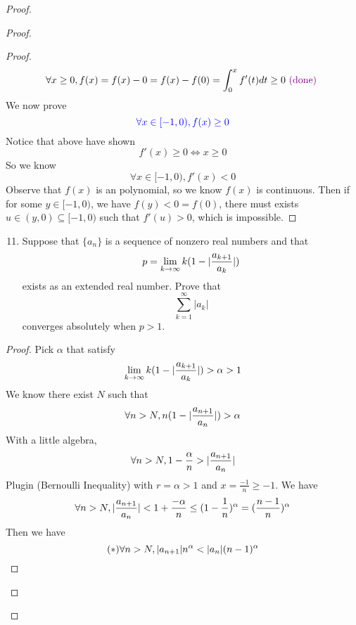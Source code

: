 \documentclass{report}
\begin{document}
\begin{proof}
\begin{proof}
\begin{proof}
\begin{equation}
\forall x\geq 0, f(x)=f(x)-0=f(x)-f(0)=\int_{0}^x f'(t)dt\geq 0\textcolor{violet}{\text{ (done) }}
\end{equation}
We now prove
\begin{equation}
\textcolor{blue}{\forall x\in [-1,0), f(x)\geq 0}
\end{equation}
Notice that above have shown
\begin{equation}
f'(x)\geq 0\iff  x\geq 0
\end{equation}
So we know
\begin{equation}
\forall x\in [-1,0), f'(x)<0
\end{equation}
Observe that $f(x)$ is an polynomial, so we know  $f(x)$ is continuous. Then if for some $y\in [-1,0)$, we have $f(y)<0=f(0)$, there must exists $u\in (y,0)\subseteq [-1,0)$ such that $f'(u)>0$, which is impossible.
\end{proof}
\begin{question}{}{}
\begin{enumerate}
    \setcounter{enumi}{10}
    \item Suppose that \( \{ a_n \} \) is a sequence of nonzero real numbers and that
    \[
    p = \lim_{{k \to \infty}} k(1-|\frac{a_{k+1}}{a_k}|)
    \]
    exists as an extended real number. Prove that
    \[
    \sum_{k=1}^{\infty} |a_k|
    \]
    converges absolutely when \( p > 1 \).
\end{enumerate}
\end{question}
\begin{proof}
Pick $\alpha $ that satisfy
\begin{equation}
\lim_{k\to\infty}k(1-|\frac{a_{k+1}}{a_k}|)>\alpha >1
\end{equation}
We know there exist $N$ such that
 \begin{equation}
\forall n>N, n(1-|\frac{a_{n+1}}{a_n}|)>\alpha 
\end{equation}
With a little algebra,
\begin{equation}
\forall n>N, 1-\frac{\alpha }{n}>|\frac{a_{n+1}}{a_n}|
\end{equation}
Plugin  (Bernoulli Inequality) with $r=\alpha >1$ and $x=\frac{-1}{n}\geq -1$. We have
\begin{equation}
\forall n>N,|\frac{a_{n+1}}{a_n}|<1+\frac{-\alpha }{n}\leq (1-\frac{1}{n})^\alpha= (\frac{n-1}{n})^{\alpha }
\end{equation}
Then we have
\begin{equation}
  (*)\forall n>N, |a_{n+1}|n^\alpha < |a_n| (n-1)^{\alpha }
\end{equation}

\end{proof}
\end{proof}
\end{proof}
\end{document}
